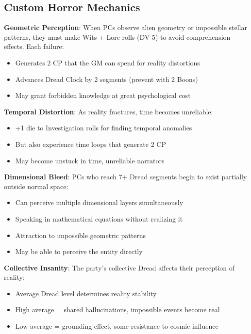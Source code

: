\documentclass[11pt]{article}
\begin{document}
\subsection*{Custom Horror Mechanics}

\begin{mdframed}[backgroundcolor=sanitybg]
\textbf{Geometric Perception}: When PCs observe alien geometry or impossible stellar patterns, they must make Wits + Lore rolls (DV 5) to avoid comprehension effects. Each failure:
\begin{itemize}[leftmargin=*]
\item Generates 2 CP that the GM can spend for reality distortions
\item Advances Dread Clock by 2 segments (prevent with 2 Boons)
\item May grant forbidden knowledge at great psychological cost
\end{itemize}

\textbf{Temporal Distortion}: As reality fractures, time becomes unreliable:
\begin{itemize}[leftmargin=*]
\item +1 die to Investigation rolls for finding temporal anomalies
\item But also experience time loops that generate 2 CP
\item May become unstuck in time, unreliable narrators
\end{itemize}

\textbf{Dimensional Bleed}: PCs who reach 7+ Dread segments begin to exist partially outside normal space:
\begin{itemize}[leftmargin=*]
\item Can perceive multiple dimensional layers simultaneously
\item Speaking in mathematical equations without realizing it
\item Attraction to impossible geometric patterns
\item May be able to perceive the entity directly
\end{itemize}

\textbf{Collective Insanity}: The party's collective Dread affects their perception of reality:
\begin{itemize}[leftmargin=*]
\item Average Dread level determines reality stability
\item High average = shared hallucinations, impossible events become real
\item Low average = grounding effect, some resistance to cosmic influence
\end{itemize}
\end{mdframed}
\end{document}
